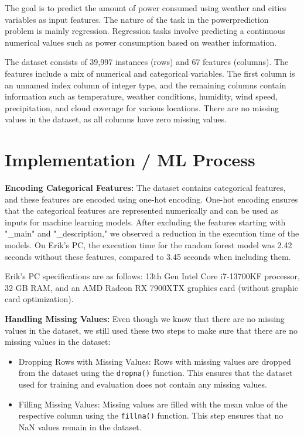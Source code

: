 \documentclass[a4, 10 pt, conference]{ieeeconf}  %
\begin{document}
The goal is to predict the amount of power consumed using weather and cities variables as input features. The nature of the task in the powerprediction problem is mainly regression. Regression tasks involve predicting a continuous numerical values such as power consumption based on weather information. 

The dataset consists of 39,997 instances (rows) and 67 features (columns). The features include a mix of numerical and categorical variables. The first column is an unnamed index column of integer type, and the remaining columns contain information such as temperature, weather conditions, humidity, wind speed, precipitation, and cloud coverage for various locations. There are no missing values in the dataset, as all columns have zero missing values.


\section{Implementation / ML Process}
\label{sec:methods}


\textbf{Encoding Categorical Features:} The dataset contains categorical features, and these features are encoded using one-hot encoding. One-hot encoding ensures that the categorical features are represented numerically and can be used as inputs for machine learning models.
After excluding the features starting with "\_main" and "\_description," we observed a reduction in the execution time of the models. On Erik's PC, the execution time for the random forest model was 2.42 seconds without these features, compared to 3.45 seconds when including them.

Erik's PC specifications are as follows: 13th Gen Intel Core i7-13700KF processor, 32 GB RAM, and an AMD Radeon RX 7900XTX graphics card (without graphic card optimization).

\textbf{Handling Missing Values:} Even though we know that there are no missing values in the dataset, we still used these two steps to make sure that there are no missing values in the dataset:
\begin{itemize}
  \item Dropping Rows with Missing Values: Rows with missing values are dropped from the dataset using the \texttt{dropna()} function. This ensures that the dataset used for training and evaluation does not contain any missing values.
  \item Filling Missing Values: Missing values are filled with the mean value of the respective column using the \texttt{fillna()} function. This step ensures that no NaN values remain in the dataset.
\end{itemize}
\end{document}
